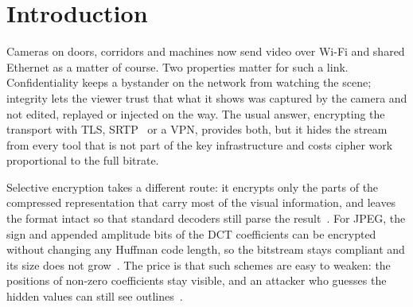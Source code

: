 \documentclass{ieeeaccess}
\begin{document}
\section{Introduction}
Cameras on doors, corridors and machines now send video over Wi-Fi and shared Ethernet as a matter of course. Two properties matter for such a link. Confidentiality keeps a bystander on the network from watching the scene; integrity lets the viewer trust that what it shows was captured by the camera and not edited, replayed or injected on the way. The usual answer, encrypting the transport with TLS, SRTP~\cite{rfc3711} or a VPN, provides both, but it hides the stream from every tool that is not part of the key infrastructure and costs cipher work proportional to the full bitrate.

Selective encryption takes a different route: it encrypts only the parts of the compressed representation that carry most of the visual information, and leaves the format intact so that standard decoders still parse the result~\cite{massoudi2008}. For JPEG, the sign and appended amplitude bits of the DCT coefficients can be encrypted without changing any Huffman code length, so the bitstream stays compliant and its size does not grow~\cite{vandroogenbroeck2002,auer2013}. The price is that such schemes are easy to weaken: the positions of non-zero coefficients stay visible, and an attacker who guesses the hidden values can still see outlines~\cite{massoudi2008,lin2024}.
\end{document}

